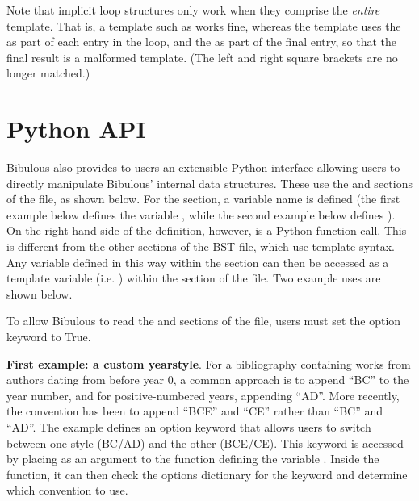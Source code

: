 \documentclass[letterpaper,10pt,english]{sphinxmanual}
\begin{document}
Note that implicit loop structures only work when they comprise the \emph{entire} template. That is, a template such as  works fine, whereas the template  uses the \code{{[}} as part of each entry in the loop, and the \code{{]}} as part of the final entry, so that the final result is a malformed template. (The left and right square brackets are no longer matched.)


\section{Python API}
\label{guidelines_for_writing_style_templates:python-api}
Bibulous also provides to users an extensible Python interface allowing users to directly manipulate Bibulous' internal data structures. These use the  and  sections of the file, as shown below. For the  section, a variable name is defined (the first example below defines the variable , while the second example below defines ). On the right hand side of the definition, however, is a Python function call. This is different from the other sections of the BST file, which use template syntax. Any variable defined in this way within the  section can then be accessed as a template variable (i.e. ) within the  section of the file. Two example uses are shown below.

To allow Bibulous to read the  and  sections of the file, users must set the option keyword  to True.

\textbf{First example: a custom yearstyle}. For a bibliography containing works from authors dating from before year 0, a common approach is to append ``BC'' to the year number, and for positive-numbered years, appending ``AD''. More recently, the convention has been to append ``BCE'' and ``CE'' rather than ``BC'' and ``AD''. The example defines an option keyword  that allows users to switch between one style (BC/AD) and the other (BCE/CE). This keyword is accessed by placing  as an argument to the  function defining the variable . Inside the function, it can then check the options dictionary for the  keyword and determine which convention to use.
\end{document}
